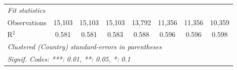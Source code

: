 \begin{tabular}{lccccccc}
   \midrule \emph{Fit statistics}\\
   Observations                                                                 & 15,103  & 15,103        & 15,103        & 13,792        & 11,356        & 11,356        & 10,359\\  
   R$^2$                                                                        & 0.581   & 0.581         & 0.583         & 0.588         & 0.596         & 0.596         & 0.598\\  
   \midrule
   \multicolumn{8}{l}{\emph{Clustered (Country) standard-errors in parentheses}}\\
   \multicolumn{8}{l}{\emph{Signif. Codes: ***: 0.01, **: 0.05, *: 0.1}}\\
\end{tabular}
\par\endgroup


